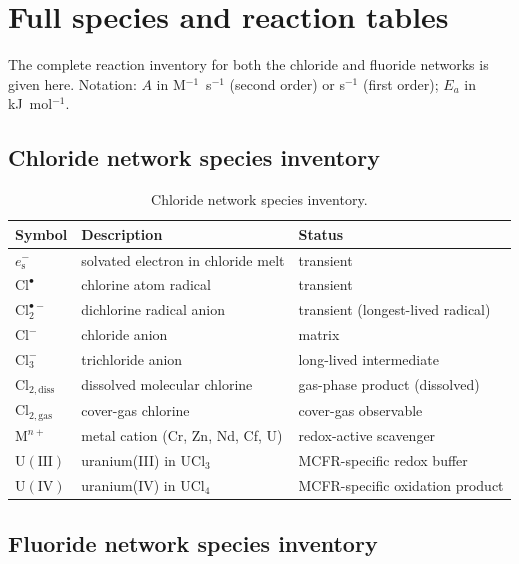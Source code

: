 \documentclass[11pt]{article}
\theoremstyle{plain}
\theoremstyle{definition}
\theoremstyle{remark}
\newcommand{\eS}{\ensuremath{e_{\mathrm{s}}^{-}}\xspace}
\newcommand{\Clt}{\ensuremath{\mathrm{Cl}_2^{\bullet-}}\xspace}
\newcommand{\Ea}{E_a}
\begin{document}
\section{Full species and reaction tables}\label{app:species}

The complete reaction inventory for both the chloride and fluoride networks
is given here.  Notation: $A$ in M$^{-1}$~s$^{-1}$ (second order) or
s$^{-1}$ (first order); $\Ea$ in kJ~mol$^{-1}$.

\subsection{Chloride network species inventory}

\begin{table}[h!]
\centering
\caption{Chloride network species inventory.}
\label{tab:species-cl}
\small
\begin{tabular}{lll}
\toprule
Symbol & Description & Status \\
\midrule
\eS & solvated electron in chloride melt & transient \\
$\mathrm{Cl}^{\bullet}$ & chlorine atom radical & transient \\
\Clt & dichlorine radical anion & transient (longest-lived radical) \\
$\mathrm{Cl}^-$ & chloride anion & matrix \\
$\mathrm{Cl}_3^-$ & trichloride anion & long-lived intermediate \\
$\mathrm{Cl}_{2,\mathrm{diss}}$ & dissolved molecular chlorine & gas-phase product (dissolved) \\
$\mathrm{Cl}_{2,\mathrm{gas}}$ & cover-gas chlorine & cover-gas observable \\
$\mathrm{M}^{n+}$ & metal cation (Cr, Zn, Nd, Cf, U) & redox-active scavenger \\
$\mathrm{U}(\mathrm{III})$ & uranium(III) in UCl$_3$ & MCFR-specific redox buffer \\
$\mathrm{U}(\mathrm{IV})$ & uranium(IV) in UCl$_4$ & MCFR-specific oxidation product \\
\bottomrule
\end{tabular}
\end{table}

\subsection{Fluoride network species inventory}
\end{document}
